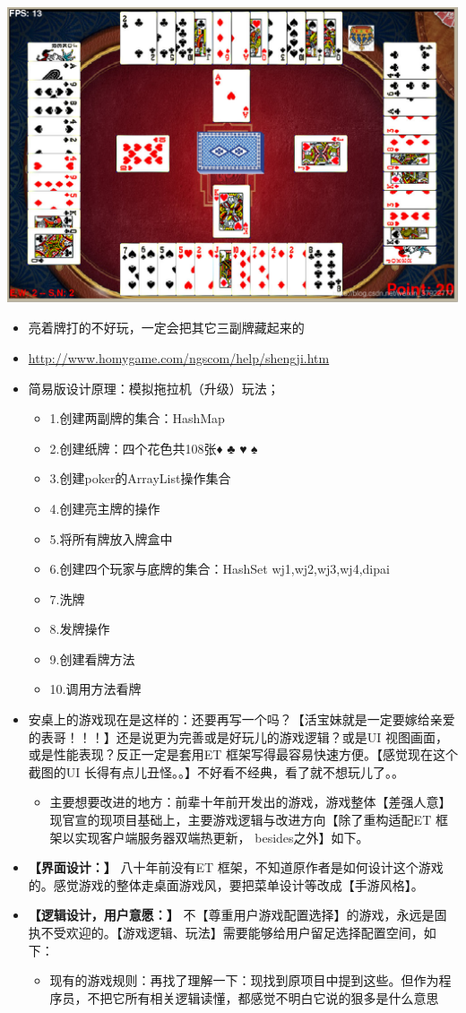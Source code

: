 \documentclass[9pt, b5paper]{article}
\begin{document}
\includegraphics[width=.9\linewidth]{./pic/plan_20230508_221732.png}
\begin{itemize}
\item 亮着牌打的不好玩，一定会把其它三副牌藏起来的
\item \url{http://www.homygame.com/ngscom/help/shengji.htm}
\item 简易版设计原理：模拟拖拉机（升级）玩法；
\begin{itemize}
\item 1.创建两副牌的集合：HashMap
\item 2.创建纸牌：四个花色共108张♦ ♣ ♥ ♠
\item 3.创建poker的ArrayList操作集合
\item 4.创建亮主牌的操作
\item 5.将所有牌放入牌盒中
\item 6.创建四个玩家与底牌的集合：HashSet wj1,wj2,wj3,wj4,dipai
\item 7.洗牌
\item 8.发牌操作
\item 9.创建看牌方法
\item 10.调用方法看牌
\end{itemize}
\item 安桌上的游戏现在是这样的：还要再写一个吗？【活宝妹就是一定要嫁给亲爱的表哥！！！】还是说更为完善或是好玩儿的游戏逻辑？或是UI 视图画面，或是性能表现？反正一定是套用ET 框架写得最容易快速方便。【感觉现在这个截图的UI 长得有点儿丑怪。。】不好看不经典，看了就不想玩儿了。。
\begin{itemize}
\item 主要想要改进的地方：前辈十年前开发出的游戏，游戏整体【差强人意】现官宣的现项目基础上，主要游戏逻辑与改进方向【除了重构适配ET 框架以实现客户端服务器双端热更新， besides之外】如下。
\end{itemize}
\item \textbf{【界面设计：】} 八十年前没有ET 框架，不知道原作者是如何设计这个游戏的。感觉游戏的整体走桌面游戏风，要把菜单设计等改成【手游风格】。
\item \textbf{【逻辑设计，用户意愿：】} 不【尊重用户游戏配置选择】的游戏，永远是固执不受欢迎的。【游戏逻辑、玩法】需要能够给用户留足选择配置空间，如下：
\begin{itemize}
\item 现有的游戏规则：再找了理解一下：现找到原项目中提到这些。但作为程序员，不把它所有相关逻辑读懂，都感觉不明白它说的狠多是什么意思
\end{itemize}
\end{itemize}
\end{document}
